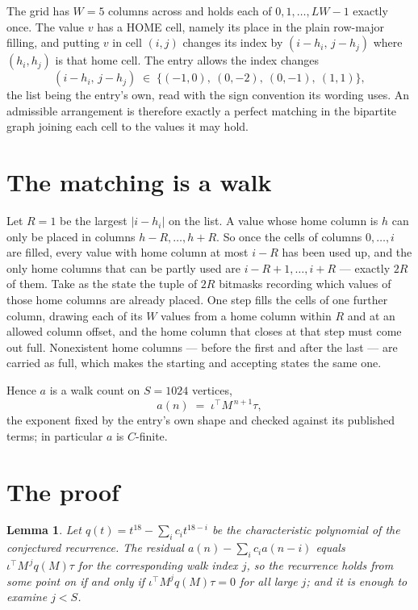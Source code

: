 \documentclass[11pt,a4paper]{article}
\theoremstyle{plain}
\newtheorem{lemma}[theorem]{Lemma}
\theoremstyle{definition}
\begin{document}
The grid has $W=5$ columns across and holds each of $0,1,\dots,LW-1$ exactly once. The value
$v$ has a HOME cell, namely its place in the plain row-major filling, and putting $v$ in cell
$(i,j)$ changes its index by $(i-h_i,\,j-h_j)$ where $(h_i,h_j)$ is that home cell. The entry
allows the index changes
\[
(i-h_i,\,j-h_j)\;\in\;\{(-1,0),\ (0,-2),\ (0,-1),\ (1,1)\},
\]
the list being the entry's own, read with the sign convention its wording uses. An admissible
arrangement is therefore exactly a perfect matching in the bipartite graph joining each cell to
the values it may hold.

\section{The matching is a walk}

Let $R=1$ be the largest $|i-h_i|$ on the list. A value whose home column is $h$ can only be
placed in columns $h-R,\dots,h+R$. So once the cells of columns $0,\dots,i$ are filled, every
value with home column at most $i-R$ has been used up, and the only home columns that can be
partly used are $i-R+1,\dots,i+R$ --- exactly $2R$ of them. Take as the state the tuple of
$2R$ bitmasks recording which values of those home columns are already placed. One step fills
the cells of one further column, drawing each of its $W$ values from a home column within $R$
and at an allowed column offset, and the home column that closes at that step must come out
full. Nonexistent home columns --- before the first and after the last --- are carried as
full, which makes the starting and accepting states the same one.

Hence $a$ is a walk count on $S=1024$ vertices,
\[
a(n)\;=\;\iota^{\!\top}M^{\,n+1}\tau ,
\]
the exponent fixed by the entry's own shape and checked against its published terms; in
particular $a$ is $C$-finite.

\section{The proof}

\begin{lemma}\label{lem:crit}
Let $q(t)=t^{18}-\sum_i c_it^{18-i}$ be the characteristic polynomial of the
conjectured recurrence. The residual $a(n)-\sum_ic_ia(n-i)$ equals
$\iota^{\!\top}M^{\,j}q(M)\tau$ for the corresponding walk index $j$, so the recurrence
holds from some point on if and only if $\iota^{\!\top}M^{j}q(M)\tau=0$ for all large $j$;
and it is enough to examine $j<S$.
\end{lemma}
\end{document}
